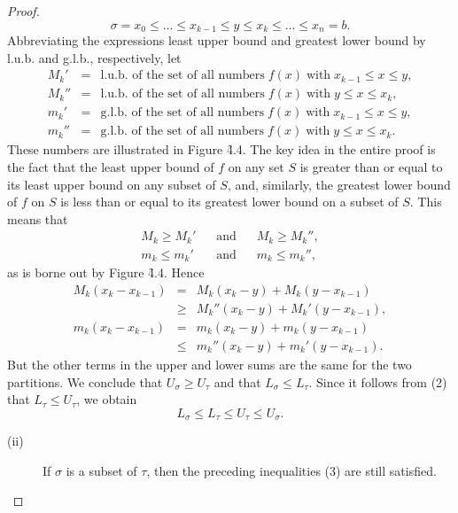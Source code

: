 \begin{proof}
$$
\sigma = x_0 \leq ... \leq x_{k-1} \leq y \leq x_k \leq ... \leq x_n = b.
$$
\noindent Abbreviating the expressions least upper bound and greatest lower bound by l.u.b. and g.l.b., respectively, let
\begin{eqnarray*}
M_{k}'  &=&\mbox{l.u.b. of the set of all numbers} \;f(x) \;\mbox{with}\; x_{k-1} \leq x \leq y,\\
M_{k}'' &=&\mbox{l.u.b. of the set of all numbers} \;f(x) \;\mbox{with}\; y \leq x \leq x_{k},  \\
m_{k}'  &=&\mbox{g.l.b. of the set of all numbers} \;f(x) \;\mbox{with}\; x_{k-1} \leq x \leq y,\\
m_{k}'' &=&\mbox{g.l.b. of the set of all numbers} \;f(x) \;\mbox{with}\; y \leq x \leq x_k. 
\end{eqnarray*}
These numbers are illustrated in Figure \f{4.4}.
The key idea in the entire proof is the fact that the least upper bound of $f$ on any set $S$ is greater than or equal to its least upper bound on any subset of $S$, and, similarly, the greatest lower bound of $f$ on $S$ is less than or equal to its greatest lower bound on a subset of $S$. This means that
\begin{eqnarray*}
M_{k} \geq M_{k}'   & \;\;\;\mbox{and}\;\;\; &      M_{k} \geq M_{k}'',\\
m_{k} \leq m_{k}'   & \;\;\;\mbox{and}\;\;\; &      m_{k} \leq m_{k}'',
\end{eqnarray*}
as is borne out by Figure \f{4.4}. Hence 
\begin{eqnarray*}
M_{k}(x_{k} - x_{k-1}) &=& M_{k}(x_{k} - y) + M_{k} (y - x_{k-1}) \\
                       &\geq& M_{k}'' (x_{k} - y) + M_{k}' (y - x_{k - 1}), \\
m_{k}(x_{k} - x_{k-1}) &=& m_{k}(x_{k} - y) + m_{k}(y - x_{k -1}) \\
                       &\leq& m_{k}'' (x_{k} - y) + m_{k}' (y - x_{k - 1}).
\end{eqnarray*}
But the other terms in the upper and lower sums are the same for the two partitions. We conclude that $U_{\sigma} \geq U_{\tau}$ and that $L_{\sigma} \leq L_{\tau}$. Since it follows from (2) that $L_{\tau} \leq U_{\tau}$, we obtain
\begin{equation}
L_{\sigma} \leq L_{\tau} \leq U_{\tau} \leq U_{\sigma}. 
\label{eq4.1.3}
\end{equation}

 
\begin{description}
\item[(ii)] If $\sigma$ is a subset of $\tau$, then the preceding inequalities (3) are still satisfied.



\end{description}
\end{proof}
